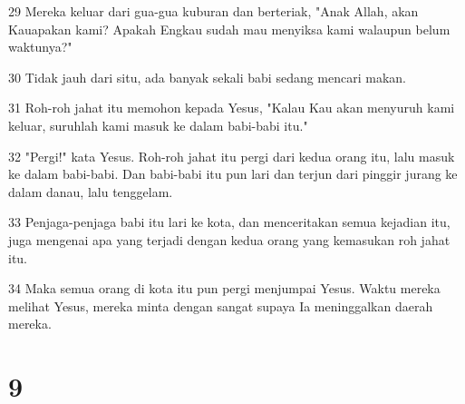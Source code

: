 \par 29 Mereka keluar dari gua-gua kuburan dan berteriak, "Anak Allah, akan Kauapakan kami? Apakah Engkau sudah mau menyiksa kami walaupun belum waktunya?"
\par 30 Tidak jauh dari situ, ada banyak sekali babi sedang mencari makan.
\par 31 Roh-roh jahat itu memohon kepada Yesus, "Kalau Kau akan menyuruh kami keluar, suruhlah kami masuk ke dalam babi-babi itu."
\par 32 "Pergi!" kata Yesus. Roh-roh jahat itu pergi dari kedua orang itu, lalu masuk ke dalam babi-babi. Dan babi-babi itu pun lari dan terjun dari pinggir jurang ke dalam danau, lalu tenggelam.
\par 33 Penjaga-penjaga babi itu lari ke kota, dan menceritakan semua kejadian itu, juga mengenai apa yang terjadi dengan kedua orang yang kemasukan roh jahat itu.
\par 34 Maka semua orang di kota itu pun pergi menjumpai Yesus. Waktu mereka melihat Yesus, mereka minta dengan sangat supaya Ia meninggalkan daerah mereka.

\chapter{9}

